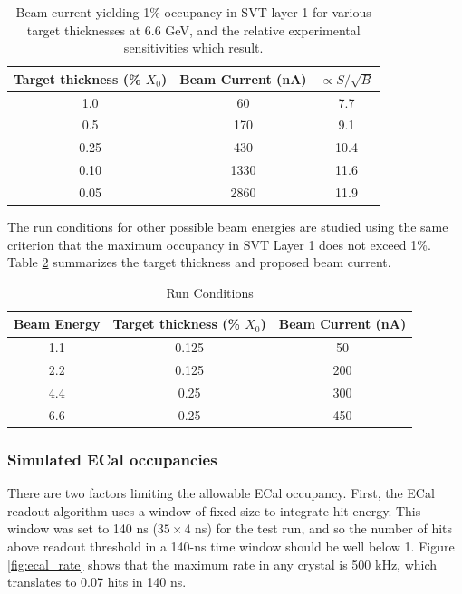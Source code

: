 \begin{table}[h]
\begin{center}
\begin{tabular}{|c|c|c|} \hline
  Target thickness (\% $X_0$) & Beam Current (nA) & $\propto S/\sqrt{B}$ \\ \hline
  1.0 & 60 & 7.7 \\ \hline
  0.5 & 170 & 9.1 \\ \hline
  0.25 & 430 & 10.4 \\ \hline
  0.10 & 1330 & 11.6 \\ \hline
  0.05 & 2860 & 11.9 \\ \hline
\end{tabular}
\end{center}
\caption{\small{Beam current yielding 1\% occupancy in SVT layer 1 for various target 
thicknesses at 6.6 GeV, and the relative experimental sensitivities which result.}}
\label{tab:occup}
\end{table}

The run conditions for other possible beam energies are studied using the same criterion that the maximum occupancy 
in SVT Layer 1 does not exceed 1\%. Table \ref{tab:runc} summarizes the target thickness and proposed beam current. 

\begin{table}[h]
\begin{center}
\begin{tabular}{|c|c|c|} \hline
  Beam Energy & Target thickness (\% $X_0$) & Beam Current (nA) \\ \hline
  1.1 & 0.125 & 50 \\ \hline
  2.2 & 0.125 & 200 \\ \hline
  4.4 & 0.25  & 300 \\ \hline
  6.6 & 0.25 & 450 \\ \hline
\end{tabular}
\end{center}
\caption{\small{Run Conditions}}
\label{tab:runc}
\end{table}

\subsubsection{Simulated ECal occupancies}

There are two factors limiting the allowable ECal occupancy. First, the ECal 
readout algorithm uses a window of fixed size to integrate hit energy. This 
window was set to 140 ns ($35 \times 4$ ns) for the test run, and so the 
number of hits above readout threshold in a 140-ns time window should be well 
below 1. Figure \ref{fig:ecal_rate} shows that the maximum rate in any crystal 
is 500 kHz, which translates to 0.07 hits in 140 ns.

